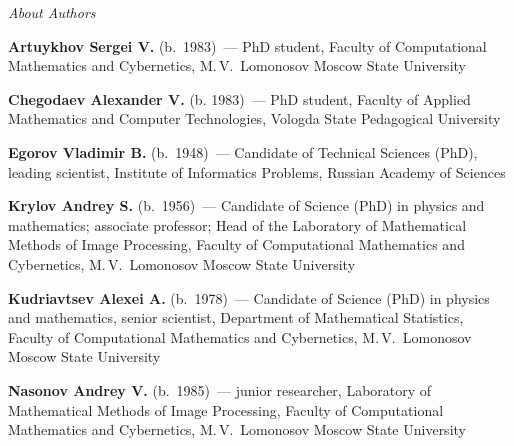 
\vspace*{-48pt}
\begin{center}\LARGE
\textit{About Authors}
\end{center}
\thispagestyle{empty}

\vspace*{36pt} %


\begin{multicols}{2}

\noindent %
\textbf{Artuykhov  Sergei V.} (b.\ 1983)~---  PhD student, Faculty of Computational Mathematics and Cybernetics,
M.\,V.~Lomonosov Moscow State University

\vspace*{6pt}


\noindent %
\textbf{Chegodaev Alexander V.} (b. 1983)~--- PhD student, Faculty of Applied
Mathematics and Computer Technologies, Vologda State Pedagogical University

\vspace*{6pt}


\noindent %
\textbf{Egorov Vladimir B.} (b.\ 1948)~--- Candidate of Technical Sciences (PhD),
leading scientist,
Institute of Informatics Problems, Russian Academy of Sciences

\vspace*{6pt}

\noindent
\textbf{Krylov Andrey S.} (b.\ 1956)~--- Candidate of Science (PhD) in
physics and mathematics; associate professor; Head of the Laboratory of
Mathematical Methods of Image Processing, Faculty of  Computational
Mathematics and Cybernetics, M.\,V.~Lomonosov Moscow State University

\vspace*{6pt}

\noindent  %
\textbf{Kudriavtsev Alexei A.} (b.\ 1978)~---  Candidate of Science (PhD) in physics
and mathematics, senior scientist, Department of Mathematical Statistics, Faculty of
Computational Mathematics and Cybernetics, M.\,V.~Lomonosov Moscow State University


\vspace*{6pt}

\noindent
\textbf{Nasonov Andrey V.} (b.\  1985)~--- junior researcher, Laboratory
of Mathematical Methods of Image Processing, Faculty of Computational
Mathematics and Cybernetics, M.\,V.~Lomonosov Moscow State University

\vspace*{6pt}


\end{multicols}
